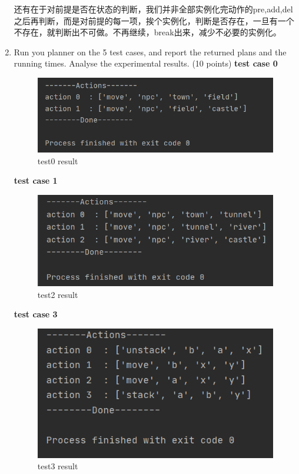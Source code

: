 \documentclass[a4paper, 11pt]{article}
\begin{document}
\begin{enumerate}
	还有在于对前提是否在状态的判断，我们并非全部实例化完动作的pre,add,del之后再判断，而是对前提的每一项，挨个实例化，判断是否存在，一旦有一个不存在，就判断出不可做。不再继续，break出来，减少不必要的实例化。
\item Run you planner on the 5 test cases, and report the returned plans and the running times. Analyse the experimental results. (10 points)
	\textbf{test case 0}
	\begin{figure}[H]
	\centering
	\includegraphics[width=1\textwidth]{Pic/test0.png}
	\caption{test0 result}
	\end{figure}
	
	\textbf{test case 1}
	\begin{figure}[H]
	\centering
	\includegraphics[width=1\textwidth]{Pic/test1.png}
	\caption{test2 result}
	\end{figure}
	
	
	\textbf{test case 3}
	\begin{figure}[H]
	\centering
	\includegraphics[width=1\textwidth]{Pic/test3.png}
	\caption{test3 result}
	\end{figure}
	

\end{enumerate}
\end{document}
